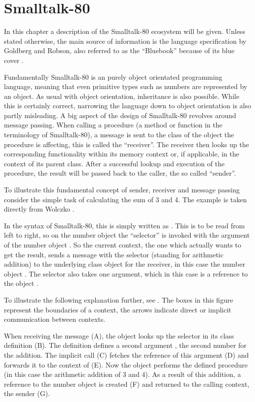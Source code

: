 \chapter{Smalltalk-80}\label{cha:chapter3}
In this chapter a description of the Smalltalk-80 ecosystem will be given. 
Unless stated otherwise, the main source of information is the language specification by Goldberg and Robson, also referred to as the \enquote{Bluebook} because of its blue cover \cite{bluebook1983}.

Fundamentally Smalltalk-80 is an purely object orientated programming language, meaning that even primitive types such as numbers are represented by an object. 
As usual with object orientation, inheritance is also possible.
While this is certainly correct, narrowing the language down to object orientation is also partly misleading. 
A big aspect of the design of Smalltalk-80 revolves around message passing. 
When calling a procedure (a method or function in the terminology of Smalltalk-80), a message is sent to the class of the object the procedure is affecting, this is called the \enquote{receiver}.
The receiver then looks up the corresponding functionality within its memory context or, if applicable, in the context of its parent class.
After a successful lookup and execution of the procedure, the result will be passed back to the caller, the so called \enquote{sender}. 

To illustrate this fundamental concept of sender, receiver and message passing consider the simple task of calculating the sum of 3 and 4. 
The example is taken directly from Wolczko \cite{Wolczko1984}.

In the syntax of Smalltalk-80, this is simply written as .
This is to be read from left to right, so on the number object  the \enquote{selector} \stcode{+} is invoked with the argument of the number object .
So the current context, the one which actually wants to get the result, sends a message with the selector \stcode{+} (standing for arithmetic addition) to the underlying class object for the receiver, in this case the number object . 
The selector \stcode{+} also takes one argument, which in this case is a reference to the object . 

To illustrate the following explanation further, see . The boxes in this figure represent the boundaries of a context, the arrows indicate direct or implicit communication between contexts.

When receiving the message (A), the object  looks up the selector in its class definition (B). 
The definition defines a second argument , the second number for the addition. The implicit call (C) fetches the reference of this argument (D) and forwards it to the context of  (E).
Now the object  performs the defined procedure (in this case the arithmetic addition of 3 and 4). 
As a result of this addition, a reference to the number object  is created (F) and returned to the calling context, the sender (G). 

